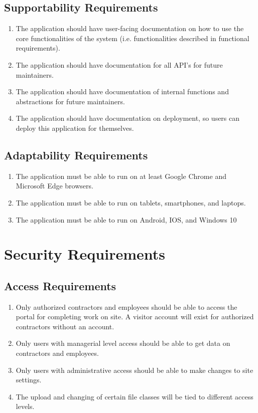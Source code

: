 \documentclass[12pt]{article}
\begin{document}
\subsection{Supportability Requirements}
\begin{enumerate} [{MS-SUP}1.]
  \item The application should have user-facing documentation on how to use the
    core functionalities of the system (i.e. functionalities described in
    functional requirements).
  \item The application should have documentation for all API's for future
    maintainers.
  \item The application should have documentation of internal functions and
    abstractions for future maintainers.
  \item The application should have documentation on deployment, so users can
    deploy this application for themselves.
\end{enumerate}
\subsection{Adaptability Requirements}
\begin{enumerate} [{MS-ADP}1.]
  \item The application must be able to run on at least Google Chrome and
    Microsoft Edge browsers.
  \item The application must be able to run on tablets, smartphones, and
    laptops.
  \item The application must be able to run on Android, IOS, and Windows 10
\end{enumerate}

\section{Security Requirements}
\subsection{Access Requirements}
\begin{enumerate} [{SR-AR}1.]
  \item Only authorized contractors and employees should be able to access the
    portal for completing work on site. A visitor account will exist for authorized contractors without an account.
  \item Only users with managerial level access should be able to get data on
    contractors and employees.
  \item Only users with administrative access should be able to make changes to
    site settings.
  \item The upload and changing of certain file classes will be tied to
    different access levels.
\end{enumerate}
\end{document}
